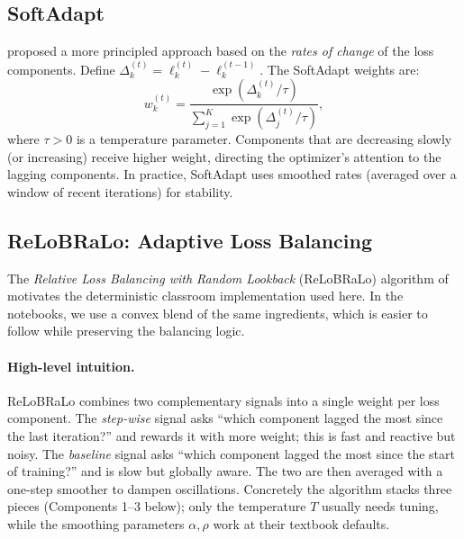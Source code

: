 \documentclass[11pt,a4paper]{report}
\begin{document}
\subsection{SoftAdapt}

\citet{heydari2019softadapt} proposed a more principled approach based on the \emph{rates of change} of the loss components.  Define $\Delta_k^{(t)} = \ell_k^{(t)} - \ell_k^{(t-1)}$.  The SoftAdapt weights are:
\begin{equation}
w_k^{(t)} = \frac{\exp(\Delta_k^{(t)}/\tau)}{\sum_{j=1}^K \exp(\Delta_j^{(t)}/\tau)},
\end{equation}
where $\tau > 0$ is a temperature parameter.  Components that are decreasing slowly (or increasing) receive higher weight, directing the optimizer's attention to the lagging components.  In practice, SoftAdapt uses smoothed rates (averaged over a window of recent iterations) for stability.

\subsection{ReLoBRaLo: Adaptive Loss Balancing}

The \emph{Relative Loss Balancing with Random Lookback} (ReLoBRaLo) algorithm of \citet{bischof2025relobralo} motivates the deterministic classroom implementation used here.  In the notebooks, we use a convex blend of the same ingredients, which is easier to follow while preserving the balancing logic.

\paragraph{High-level intuition.}  ReLoBRaLo combines two complementary signals into a single weight per loss component.  The \emph{step-wise} signal asks ``which component lagged the most since the last iteration?'' and rewards it with more weight; this is fast and reactive but noisy.  The \emph{baseline} signal asks ``which component lagged the most since the start of training?'' and is slow but globally aware.  The two are then averaged with a one-step smoother to dampen oscillations.  Concretely the algorithm stacks three pieces (Components 1--3 below); only the temperature $T$ usually needs tuning, while the smoothing parameters $\alpha,\rho$ work at their textbook defaults.
\end{document}
